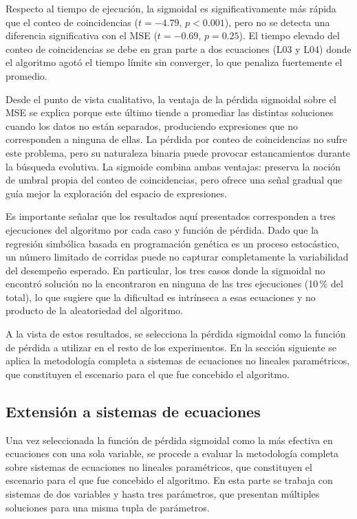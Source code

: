 \documentclass{article} \usepackage[utf8]{inputenc} \usepackage[spanish]{babel} \usepackage{amsmath, amssymb, amsthm} \usepackage{bm} \usepackage{float} \usepackage{longtable} \usepackage[hidelinks]{hyperref} \spanishdecimal{.}
\begin{document}
Respecto al tiempo de ejecución, la sigmoidal es significativamente más rápida que el conteo de coincidencias ($t = -4.79$, $p < 0.001$), pero no se detecta una diferencia significativa con el MSE ($t = -0.69$, $p = 0.25$). El tiempo elevado del conteo de coincidencias se debe en gran parte a dos ecuaciones (L03 y L04) donde el algoritmo agotó el tiempo límite sin converger, lo que penaliza fuertemente el promedio.

Desde el punto de vista cualitativo, la ventaja de la pérdida sigmoidal sobre el MSE se explica porque este último tiende a promediar las distintas soluciones cuando los datos no están separados, produciendo expresiones que no corresponden a ninguna de ellas. La pérdida por conteo de coincidencias no sufre este problema, pero su naturaleza binaria puede provocar estancamientos durante la búsqueda evolutiva. La sigmoide combina ambas ventajas: preserva la noción de umbral propia del conteo de coincidencias, pero ofrece una señal gradual que guía mejor la exploración del espacio de expresiones.

Es importante señalar que los resultados aquí presentados corresponden a tres ejecuciones del algoritmo por cada caso y función de pérdida. Dado que la regresión simbólica basada en programación genética es un proceso estocástico, un número limitado de corridas puede no capturar completamente la variabilidad del desempeño esperado. En particular, los tres casos donde la sigmoidal no encontró solución no la encontraron en ninguna de las tres ejecuciones (10\,\% del total), lo que sugiere que la dificultad es intrínseca a esas ecuaciones y no producto de la aleatoriedad del algoritmo.

A la vista de estos resultados, se selecciona la pérdida sigmoidal como la función de pérdida a utilizar en el resto de los experimentos. En la sección siguiente se aplica la metodología completa a sistemas de ecuaciones no lineales paramétricos, que constituyen el escenario para el que fue concebido el algoritmo.

\subsection{Extensión a sistemas de ecuaciones} \label{sec:fase2}

Una vez seleccionada la función de pérdida sigmoidal como la más efectiva en ecuaciones con una sola variable, se procede a evaluar la metodología completa sobre sistemas de ecuaciones no lineales paramétricos, que constituyen el escenario para el que fue concebido el algoritmo.  En esta parte se trabaja con sistemas de dos variables y hasta tres parámetros, que presentan múltiples soluciones para una misma tupla de parámetros.
\end{document}
